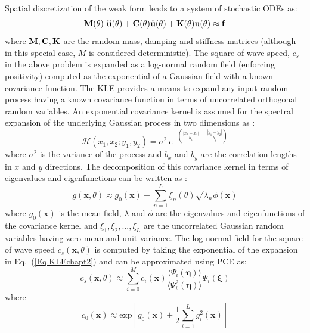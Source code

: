 \documentclass{article}
\begin{document}
Spatial discretization of the weak form leads to a system of stochastic ODEs as:
\begin{equation}
\label{Eq.randODEchapt2}
\bf{M} (\theta) \ \ddot{\bf{u}}(\theta) +  {\bf{C}} (\theta) \dot{\bf{u}}(\theta) + {\bf{K}} (\theta) \bf{u}(\theta) \approx \bf{f}
\end{equation}
where $\bf{M}, \bf{C}, \bf{K}$ are the random mass, damping and stiffness matrices (although in this special case, $M$ is considered deterministic). The square of wave speed, $c_s$ in the above problem is expanded as a log-normal random field (enforcing positivity) computed as the exponential of a Gaussian field with a known covariance function. The KLE provides a means to expand any input random process having a known covariance function in terms of uncorrelated orthogonal random variables. An exponential covariance kernel is assumed for the spectral expansion of the underlying Gaussian process in two dimensions as \cite{book_ghanem}:
\begin{equation}\label{Eq.CovarKer2D_chapt2}
\mathcal{H}(x_1,x_2;y_1,y_2) = \sigma^2\ e^{-\left({\frac{|x_1-x_2|}{b_x}  } + {\frac{|y_1-y_2|}{b_y}} \right) }
\end{equation}
where $\sigma^2$ is the variance of the process and $b_x$ and $b_y$ are the correlation lengths in $x$ and $y$ directions. The decomposition of this covariance kernel in terms of eigenvalues and eigenfunctions can be written as \cite{book_ghanem}:
\begin{equation}\label{Eq.KLEchapt2}
g(\mathbf{x},\theta) \approx {g}_0(\mathbf{x})+\sum_{n=1}^{L}{\xi_n(\theta)\sqrt{\lambda_{n}}\phi(\mathbf{x})}
\end{equation}
where $g_0(\mathbf{x})$ is the mean field, $\lambda$ and $\phi$ are the eigenvalues and eigenfunctions of the covariance kernel and $\xi_{1},\xi_{2},...,\xi_{L}$ are the uncorrelated Gaussian random variables having zero mean and unit variance. The log-normal field for the square of wave speed $c_s(\mathbf{x},\theta)$ is computed by taking the exponential of the expansion in Eq.~(\ref{Eq.KLEchapt2}) and can be approximated using PCE as\cite{lognormal_roger}:
\begin{equation}\label{Eq.c0pce}
c_s(\mathbf{x},\theta) \approx  \sum_{i=0}^{M} c_i(\mathbf{x})  \frac{\langle\Psi_i(\bm{\eta})\rangle}{\langle\Psi_i^2(\bm{\eta})\rangle}\Psi_i(\bm{\xi})
\end{equation}
where 
\begin{equation}\label{Eq.LNL0}
c_0(\mathbf{x}) \approx \mathrm{exp}\left[ g_0(\mathbf{x}) + \frac{1}{2}  \sum_{i=1}^{L} g_i^2(\mathbf{x}) \right]
\end{equation}
\end{document}
